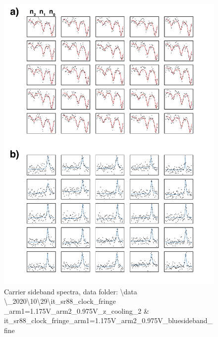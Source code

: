		\begin{figure}
		    \centering
		    \includegraphics[scale=0.8]{figures/carrier_sideband_spectra.pdf}
		    \caption{Carrier sideband spectra, data folder: \textbackslash data \textbackslash\_2020\textbackslash10\textbackslash29\textbackslash it\_sr88\_clock\_fringe\\ \_arm1=1.175V\_arm2\_0.975V\_z\_cooling\_2 \& it\_sr88\_clock\_fringe\_arm1=1.175V\_arm2\_0.975V\_bluesideband\_fine}
		    \label{fig:carrier_sideband_spectra}
		\end{figure}

